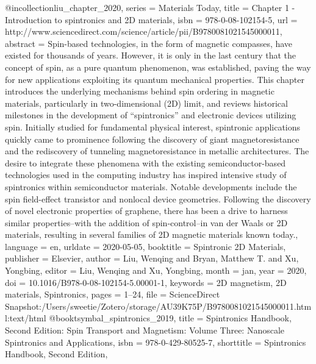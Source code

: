 {@incollection{liu_chapter_2020,
	series = {Materials {Today}},
	title = {Chapter 1 - {Introduction} to spintronics and {2D} materials},
	isbn = {978-0-08-102154-5},
	url = {http://www.sciencedirect.com/science/article/pii/B9780081021545000011},
	abstract = {Spin-based technologies, in the form of magnetic compasses, have existed for thousands of years. However, it is only in the last century that the concept of spin, as a pure quantum phenomenon, was established, paving the way for new applications exploiting its quantum mechanical properties. This chapter introduces the underlying mechanisms behind spin ordering in magnetic materials, particularly in two-dimensional (2D) limit, and reviews historical milestones in the development of “spintronics” and electronic devices utilizing spin. Initially studied for fundamental physical interest, spintronic applications quickly came to prominence following the discovery of giant magnetoresistance and the rediscovery of tunneling magnetoresistance in metallic architectures. The desire to integrate these phenomena with the existing semiconductor-based technologies used in the computing industry has inspired intensive study of spintronics within semiconductor materials. Notable developments include the spin field-effect transistor and nonlocal device geometries. Following the discovery of novel electronic properties of graphene, there has been a drive to harness similar properties–with the addition of spin-control–in van der Waals or 2D materials, resulting in several families of 2D magnetic materials known today.},
	language = {en},
	urldate = {2020-05-05},
	booktitle = {Spintronic {2D} {Materials}},
	publisher = {Elsevier},
	author = {Liu, Wenqing and Bryan, Matthew T. and Xu, Yongbing},
	editor = {Liu, Wenqing and Xu, Yongbing},
	month = jan,
	year = {2020},
	doi = {10.1016/B978-0-08-102154-5.00001-1},
	keywords = {2D magnetism, 2D materials, Spintronics},
	pages = {1--24},
	file = {ScienceDirect Snapshot:/Users/sweetie/Zotero/storage/AU39K75P/B9780081021545000011.html:text/html}
}
@book{tsymbal_spintronics_2019,
	title = {Spintronics {Handbook}, {Second} {Edition}: {Spin} {Transport} and {Magnetism}: {Volume} {Three}: {Nanoscale} {Spintronics} and {Applications}},
	isbn = {978-0-429-80525-7},
	shorttitle = {Spintronics {Handbook}, {Second} {Edition}},
}}
